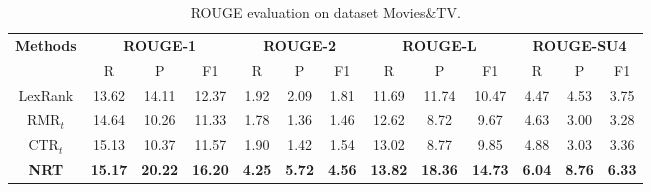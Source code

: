 \documentclass[sigconf]{acmart}
\begin{document}
\begin{table*}[!htb]
	\centering
	
	\caption{ROUGE evaluation on dataset Movies\&TV.}
	\label{tab:rouge-movies}
	\begin{tabular}{|c|c|c|c|c|c|c|c|c|c|c|c|c|}
		\hline
		\multirow{2}{*}{\textbf{Methods}} &
		\multicolumn{3}{c|}{\textbf{ROUGE-1}} &
		\multicolumn{3}{c|}{\textbf{ROUGE-2}} &
		\multicolumn{3}{c|}{\textbf{ROUGE-L}} &
		\multicolumn{3}{c|}{\textbf{ROUGE-SU4}} \\
		\cline{2-13}
		& R & P & F1 & R & P & F1& R & P & F1& R & P & F1 \\
		\hline
		LexRank & 13.62 & 14.11 & 12.37
		& 1.92 & 2.09 & 1.81
		& 11.69 & 11.74 & 10.47
		& 4.47 & 4.53 & 3.75 \\
		\hline
		RMR$_t$ & 14.64 & 10.26 & 11.33
		& 1.78 & 1.36 & 1.46
		& 12.62 & 8.72 & 9.67
		& 4.63 & 3.00 & 3.28 \\
		\hline
		CTR$_t$ & 15.13 & 10.37 & 11.57
		& 1.90 & 1.42 & 1.54
		& 13.02 & 8.77 & 9.85
		& 4.88 & 3.03 & 3.36 \\
		\hline
		\textbf{NRT} & \textbf{15.17} & \textbf{20.22} & \textbf{16.20}
		&\textbf{ 4.25} & \textbf{5.72} &\textbf{ 4.56}
		& \textbf{13.82} & \textbf{18.36} & \textbf{14.73}
		& \textbf{6.04} & \textbf{8.76} & \textbf{6.33} \\
		\hline
	\end{tabular}
	\vspace{0mm}
\end{table*}
\end{document}
